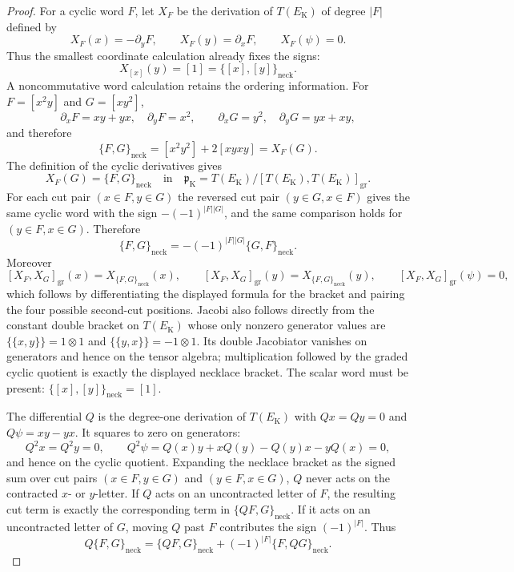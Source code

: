 \documentclass[11pt]{memoir}
\begin{document}
\begin{proof}
  For a cyclic word \(F\), let \(X_F\) be the derivation of
  \(T(E_{\mathrm K})\) of degree \(|F|\) defined by
  \[
    X_F(x)=-\partial_yF,\qquad
    X_F(y)=\partial_xF,\qquad
    X_F(\psi)=0 .
  \]
  Thus the smallest coordinate calculation already fixes the signs:
  \[
    X_{[x]}(y)=[1]=\{[x],[y]\}_{\mathrm{neck}}.
  \]
  A noncommutative word calculation retains the ordering information.  For
  \(F=[x^2y]\) and \(G=[xy^2]\),
  \[
    \partial_xF=xy+yx,\quad \partial_yF=x^2,
    \qquad
    \partial_xG=y^2,\quad \partial_yG=yx+xy,
  \]
  and therefore
  \[
    \{F,G\}_{\mathrm{neck}}
      =[x^2y^2]+2[xyxy]
      =X_F(G).
  \]
  The definition of the cyclic derivatives gives
  \[
    X_F(G)=\{F,G\}_{\mathrm{neck}}
    \quad\text{in}\quad
    \mathfrak p_{\mathrm K}
      =
    T(E_{\mathrm K})/[T(E_{\mathrm K}),T(E_{\mathrm K})]_{\mathrm{gr}} .
  \]
  For each cut pair \((x\in F,y\in G)\) the reversed cut pair
  \((y\in G,x\in F)\) gives the same cyclic word with the sign
  \(-(-1)^{|F||G|}\), and the same comparison holds for
  \((y\in F,x\in G)\).  Therefore
  \[
    \{F,G\}_{\mathrm{neck}}
      =
    -(-1)^{|F||G|}\{G,F\}_{\mathrm{neck}} .
  \]
  Moreover
  \[
    [X_F,X_G]_{\mathrm{gr}}(x)
      =X_{\{F,G\}_{\mathrm{neck}}}(x),\qquad
    [X_F,X_G]_{\mathrm{gr}}(y)
      =X_{\{F,G\}_{\mathrm{neck}}}(y),\qquad
    [X_F,X_G]_{\mathrm{gr}}(\psi)=0,
  \]
  which follows by differentiating the displayed formula for the bracket
  and pairing the four possible second-cut positions.  Jacobi also follows
  directly from the constant double bracket on \(T(E_{\mathrm K})\) whose
  only nonzero generator values are
  \(\{\!\{x,y\}\!\}=1\otimes1\) and
  \(\{\!\{y,x\}\!\}=-1\otimes1\).  Its double Jacobiator vanishes on
  generators and hence on the tensor algebra; multiplication followed by
  the graded cyclic quotient is exactly the displayed necklace bracket.
  The scalar word must be present:
  \(\{[x],[y]\}_{\mathrm{neck}}=[1]\).

  The differential \(Q\) is the degree-one derivation of
  \(T(E_{\mathrm K})\) with \(Qx=Qy=0\) and \(Q\psi=xy-yx\).  It squares
  to zero on generators:
  \[
    Q^2x=Q^2y=0,\qquad
    Q^2\psi=Q(x)y+xQ(y)-Q(y)x-yQ(x)=0,
  \]
  and hence on the cyclic quotient.  Expanding the necklace bracket as
  the signed sum over cut pairs \((x\in F,y\in G)\) and
  \((y\in F,x\in G)\), \(Q\) never acts on the contracted \(x\)- or
  \(y\)-letter.  If \(Q\) acts on an uncontracted letter of \(F\), the
  resulting cut term is exactly the corresponding term in
  \(\{QF,G\}_{\mathrm{neck}}\).  If it acts on an uncontracted letter of
  \(G\), moving \(Q\) past \(F\) contributes the sign
  \((-1)^{|F|}\).  Thus
  \[
    Q\{F,G\}_{\mathrm{neck}}
      =\{QF,G\}_{\mathrm{neck}}
       +(-1)^{|F|}\{F,QG\}_{\mathrm{neck}}.
  \]


\end{proof}
\end{document}
